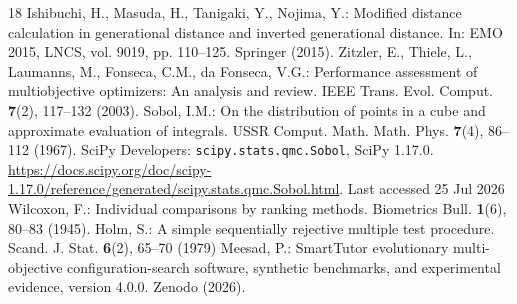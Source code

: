 \documentclass[runningheads]{llncs}
\newcommand{\artifactdoi}{10.5281/zenodo.21582888}
\begin{document}
\begin{thebibliography}{18}
 Ishibuchi, H., Masuda, H., Tanigaki, Y., Nojima, Y.: Modified distance calculation in generational distance and inverted generational distance. In: EMO 2015, LNCS, vol. 9019, pp. 110--125. Springer (2015). 
 Zitzler, E., Thiele, L., Laumanns, M., Fonseca, C.M., da Fonseca, V.G.: Performance assessment of multiobjective optimizers: An analysis and review. IEEE Trans. Evol. Comput. \textbf{7}(2), 117--132 (2003). 
 Sobol, I.M.: On the distribution of points in a cube and approximate evaluation of integrals. USSR Comput. Math. Math. Phys. \textbf{7}(4), 86--112 (1967). 
 SciPy Developers: \texttt{scipy.stats.qmc.Sobol}, SciPy 1.17.0. \url{https://docs.scipy.org/doc/scipy-1.17.0/reference/generated/scipy.stats.qmc.Sobol.html}. Last accessed 25 Jul 2026
 Wilcoxon, F.: Individual comparisons by ranking methods. Biometrics Bull. \textbf{1}(6), 80--83 (1945). 
 Holm, S.: A simple sequentially rejective multiple test procedure. Scand. J. Stat. \textbf{6}(2), 65--70 (1979)
 Meesad, P.: SmartTutor evolutionary multi-objective configuration-search software, synthetic benchmarks, and experimental evidence, version 4.0.0. Zenodo (2026). \doi{\artifactdoi}
\end{thebibliography}
\end{document}
